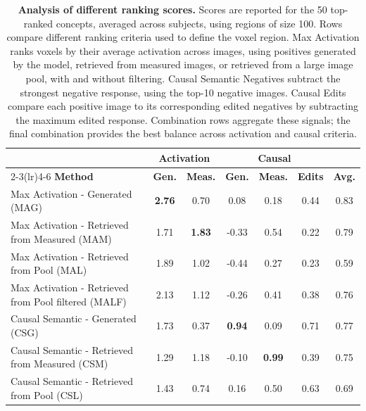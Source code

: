 
\begin{table}[ht]
\centering
\setlength{\tabcolsep}{3.6pt}
\caption{\textbf{Analysis of different ranking scores.} Scores are reported for the 50 top-ranked concepts, averaged across subjects, using regions of size 100. Rows compare different ranking criteria used to define the voxel region. Max Activation ranks voxels by their average activation across images, using positives generated by the model, retrieved from measured images, or retrieved from a large image pool, with and without filtering. Causal Semantic Negatives subtract the strongest negative response, using the top-10 negative images. Causal Edits compare each positive image to its corresponding edited negatives by subtracting the maximum edited response. Combination rows aggregate these signals; the final combination provides the best balance across activation and causal criteria.}
\vspace{+0.12cm}
\begin{tabular}{@{}lcccccc@{}}
\toprule
& \multicolumn{2}{c}{\textbf{Activation}}
& \multicolumn{3}{c}{\textbf{Causal}}
&  \\
\cmidrule(lr){2-3}\cmidrule(lr){4-6}
\textbf{Method}
& \textbf{Gen.}
& \textbf{Meas.}
& \textbf{Gen.}
& \textbf{Meas.}
& \textbf{Edits}
& \textbf{Avg.} \\
\midrule

Max Activation - Generated (MAG)
& \textbf{2.76} & 0.70 & 0.08 & 0.18 & 0.44 & 0.83 \\

Max Activation - Retrieved from Measured (MAM)
& 1.71 & \textbf{1.83} & -0.33 & 0.54 & 0.22 & 0.79 \\

Max Activation - Retrieved from Pool (MAL)
& 1.89 & 1.02 & -0.44 & 0.27 & 0.23 & 0.59 \\

Max Activation - Retrieved from Pool filtered (MALF)
& 2.13 & 1.12 & -0.26 & 0.41 & 0.38 & 0.76 \\

Causal Semantic - Generated (CSG)
& 1.73 & 0.37 & \textbf{0.94} & 0.09 & 0.71 & 0.77 \\

Causal Semantic - Retrieved from Measured (CSM)
& 1.29 & 1.18 & -0.10 & \textbf{0.99} & 0.39 & 0.75 \\

Causal Semantic - Retrieved from Pool (CSL)
& 1.43 & 0.74 & 0.16 & 0.50 & 0.63 & 0.69 \\


\end{tabular}
\end{table}
